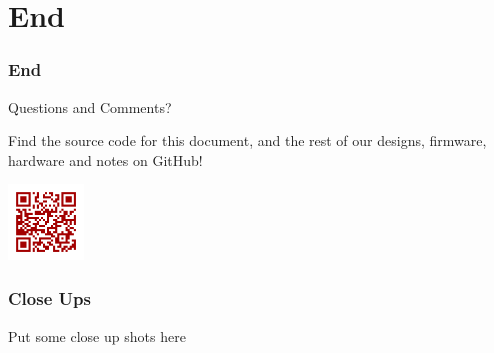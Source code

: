 \documentclass[aspectratio=169]{beamer}
\begin{document}
\section{End}
\begin{frame}
    \frametitle{End}

    \begin{block}{}
        \begin{center}
            \Huge Questions and Comments?
        \end{center}
    \end{block}

    \begin{center}
        Find the source code for this document, and the rest of our designs, firmware, hardware
        and notes on GitHub!

        \includegraphics[height=2cm]{github_qr}
    \end{center}

\end{frame}

\begin{frame}
    \frametitle{Close Ups}

    Put some close up shots here
\end{frame}
\end{document}

